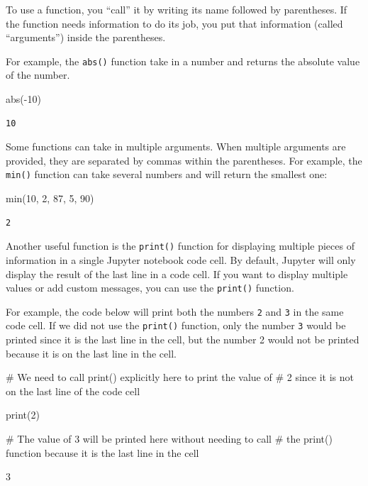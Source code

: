 \documentclass[
  letterpaper,
  DIV=11,
  numbers=noendperiod]{scrreprt}
\newenvironment{Shaded}{\begin{snugshade}}{\end{snugshade}}
\newcommand{\BuiltInTok}[1]{\textcolor[rgb]{0.00,0.23,0.31}{#1}}
\newcommand{\CommentTok}[1]{\textcolor[rgb]{0.37,0.37,0.37}{#1}}
\newcommand{\DecValTok}[1]{\textcolor[rgb]{0.68,0.00,0.00}{#1}}
\newcommand{\NormalTok}[1]{\textcolor[rgb]{0.00,0.23,0.31}{#1}}
\newcommand{\OperatorTok}[1]{\textcolor[rgb]{0.37,0.37,0.37}{#1}}
\begin{document}
To use a function, you ``call'' it by writing its name followed by
parentheses. If the function needs information to do its job, you put
that information (called ``arguments'') inside the parentheses.

For example, the \texttt{abs()} function take in a number and returns
the absolute value of the number.

\begin{Shaded}
\begin{Highlighting}[]
\BuiltInTok{abs}\NormalTok{(}\OperatorTok{{-}}\DecValTok{10}\NormalTok{)}
\end{Highlighting}
\end{Shaded}

\begin{verbatim}
10
\end{verbatim}

Some functions can take in multiple arguments. When multiple arguments
are provided, they are separated by commas within the parentheses. For
example, the \texttt{min()} function can take several numbers and will
return the smallest one:

\begin{Shaded}
\begin{Highlighting}[]
\BuiltInTok{min}\NormalTok{(}\DecValTok{10}\NormalTok{, }\DecValTok{2}\NormalTok{, }\DecValTok{87}\NormalTok{, }\DecValTok{5}\NormalTok{, }\DecValTok{90}\NormalTok{)}
\end{Highlighting}
\end{Shaded}

\begin{verbatim}
2
\end{verbatim}

Another useful function is the \texttt{print()} function for displaying
multiple pieces of information in a single Jupyter notebook code cell.
By default, Jupyter will only display the result of the last line in a
code cell. If you want to display multiple values or add custom
messages, you can use the \texttt{print()} function.

For example, the code below will print both the numbers \texttt{2} and
\texttt{3} in the same code cell. If we did not use the \texttt{print()}
function, only the number \texttt{3} would be printed since it is the
last line in the cell, but the number 2 would not be printed because it
is on the last line in the cell.

\begin{Shaded}
\begin{Highlighting}[]
\CommentTok{\# We need to call print() explicitly here to print the value of }
\CommentTok{\# 2 since it is not on the last line of the code cell}

\BuiltInTok{print}\NormalTok{(}\DecValTok{2}\NormalTok{)  }



\CommentTok{\# The value of 3 will be printed here without needing to call }
\CommentTok{\# the print() function because it is the last line in the cell}

\DecValTok{3}
\end{Highlighting}
\end{Shaded}
\end{document}
